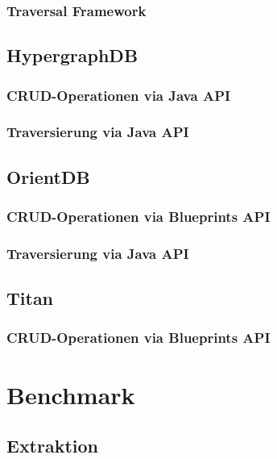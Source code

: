 \subsubsection{Traversal Framework}
\label{anh:neo4j_traversal_framework}

\subsection{HypergraphDB}

\subsubsection{CRUD-Operationen via Java API}

\subsubsection{Traversierung via Java API}

\subsection{OrientDB}

\subsubsection{CRUD-Operationen via Blueprints API}
\label{anh:orientdb_blueprints_api}

\subsubsection{Traversierung via Java API}
\label{anh:orientdb_traverse_java}

\subsection*{Titan}

\subsubsection{CRUD-Operationen via Blueprints API}
\label{anh:titan_blueprints_api}

\section{Benchmark}

\subsection{Extraktion}
\label{anh:extraction}

